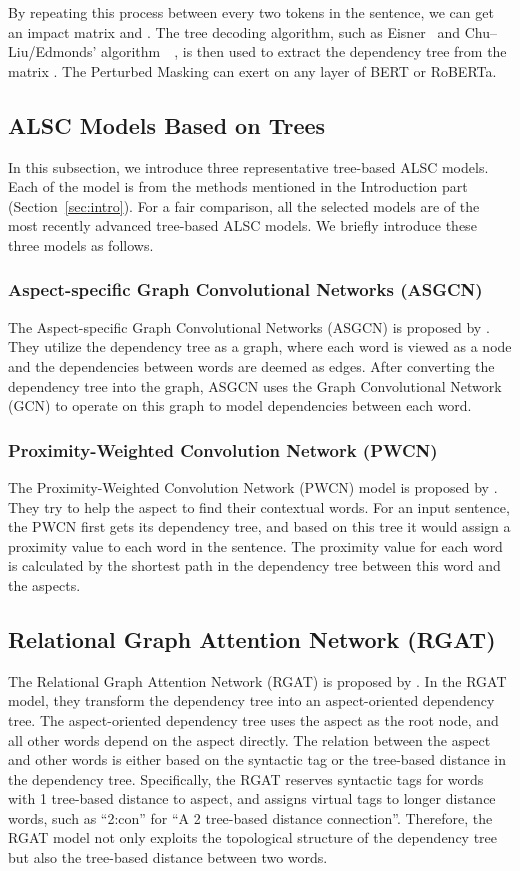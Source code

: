 \documentclass[11pt]{article}
\begin{document}
By repeating this process between every two tokens in the sentence, we can get an impact matrix  and . The tree decoding algorithm, such as Eisner~\citep{DBLP:conf/coling/Eisner96} and Chu–Liu/Edmonds' algorithm~{~\citep{1965On,edmonds1967optimum}},  is then used to extract the dependency tree from the matrix .  The  Perturbed Masking  can exert on any layer of BERT or RoBERTa.


\subsection{ALSC Models Based on Trees}
\label{sec:ALSC_models}
In this subsection, we introduce three representative tree-based ALSC models. Each of the model is from the  methods mentioned in the Introduction part (Section~\ref{sec:intro}). For a fair comparison, all the selected models are of the most recently advanced tree-based ALSC models.
We briefly introduce these three models as follows.


\subsubsection{Aspect-specific Graph Convolutional Networks (ASGCN)}
The Aspect-specific Graph Convolutional Networks (ASGCN) is proposed by \citet{DBLP:conf/emnlp/SunZMML19}. They utilize the dependency tree as a graph, where each word is viewed as a node and the dependencies between words are deemed as edges. After converting the dependency tree into the graph, ASGCN uses the Graph Convolutional Network (GCN) to operate on this graph to model dependencies between each word.
\subsubsection{Proximity-Weighted Convolution Network (PWCN)}
The Proximity-Weighted Convolution Network (PWCN) model is proposed by \citet{DBLP:conf/sigir/ZhangL019}. They try to help the aspect to find their contextual words. For an input sentence, the PWCN first gets its dependency  tree, and based on this tree it would assign a proximity value to each word in the sentence. The proximity value for each word is calculated by the shortest path in the dependency tree between this word and the aspects.
\subsection{Relational Graph Attention Network (RGAT)}
The Relational Graph Attention Network (RGAT) is proposed by \citet{DBLP:conf/acl/WangSYQW20}. In the RGAT model, they transform the dependency tree into an aspect-oriented dependency tree. The aspect-oriented dependency tree uses the aspect as the root node, and all other  words  depend on the aspect directly. The relation between the aspect and other words is either based on the syntactic tag or the tree-based distance in the dependency tree. Specifically, the RGAT reserves syntactic tags for words with 1 tree-based distance to aspect, and assigns virtual tags to longer distance words, such as ``2:con'' for ``A 2 tree-based distance connection''. Therefore, the RGAT model not only exploits the topological structure of the dependency tree but also the tree-based distance between two words.
\end{document}
